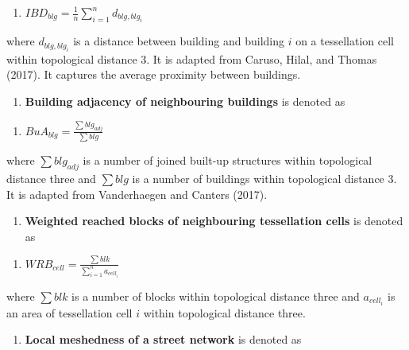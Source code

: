 \documentclass[
  letterpaper,
  DIV=11,
  numbers=noendperiod]{scrartcl}
\providecommand{\tightlist}{%
  \setlength{\itemsep}{0pt}\setlength{\parskip}{0pt}}\usepackage{longtable,booktabs,array}
\begin{document}
\begin{enumerate}
\def\labelenumi{(\arabic{enumi})}
\setcounter{enumi}{36}
\tightlist
\item
  \(IBD_{blg} = \frac{1}{n} \sum_{i=1}^{n} d_{blg, blg_i}\)
\end{enumerate}

where \(d_{blg, blg_i}\) is a distance between building and building
\(i\) on a tessellation cell within topological distance 3. It is
adapted from Caruso, Hilal, and Thomas (2017). It captures the average
proximity between buildings.

\begin{enumerate}
\def\labelenumi{\arabic{enumi}.}
\setcounter{enumi}{37}
\tightlist
\item
  \textbf{‌Building adjacency of neighbouring buildings} is denoted as
\end{enumerate}

\begin{enumerate}
\def\labelenumi{(\arabic{enumi})}
\setcounter{enumi}{37}
\tightlist
\item
  \(BuA_{blg} = \frac{\sum blg_{adj}}{\sum blg}\)
\end{enumerate}

where \(\sum blg_{adj}\) is a number of joined built-up structures
within topological distance three and \(\sum blg\) is a number of
buildings within topological distance 3. It is adapted from Vanderhaegen
and Canters (2017).

\begin{enumerate}
\def\labelenumi{\arabic{enumi}.}
\setcounter{enumi}{38}
\tightlist
\item
  \textbf{Weighted reached blocks of neighbouring tessellation cells} is
  denoted as
\end{enumerate}

\begin{enumerate}
\def\labelenumi{(\arabic{enumi})}
\setcounter{enumi}{38}
\tightlist
\item
  \(WRB_{cell} = \frac{\sum blk}{\sum_{i=1}^{n} a_{cell_i}}\)
\end{enumerate}

where \(\sum blk\) is a number of blocks within topological distance
three and \(a_{cell_i}\) is an area of tessellation cell \(i\) within
topological distance three.

\begin{enumerate}
\def\labelenumi{\arabic{enumi}.}
\setcounter{enumi}{39}
\tightlist
\item
  \textbf{Local meshedness of a street network} is denoted as
\end{enumerate}
\end{document}
